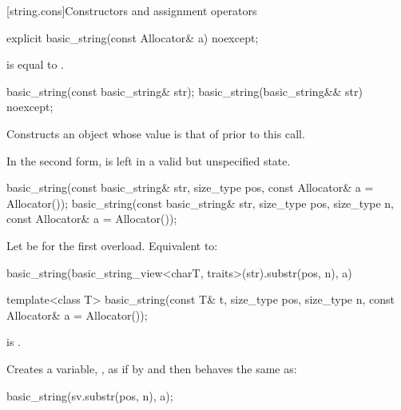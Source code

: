 [string.cons]{Constructors and assignment operators}

%
\begin{itemdecl}
explicit basic_string(const Allocator& a) noexcept;
\end{itemdecl}

\begin{itemdescr}

\pnum
\ensures
{} is equal to .
\end{itemdescr}

%
\begin{itemdecl}
basic_string(const basic_string& str);
basic_string(basic_string&& str) noexcept;
\end{itemdecl}

\begin{itemdescr}
\pnum
\effects
Constructs an object whose
value is that of  prior to this call.

\pnum
\remarks
In the second form,  is left in a valid but unspecified state.
\end{itemdescr}

%
\begin{itemdecl}
basic_string(const basic_string& str, size_type pos,
             const Allocator& a = Allocator());
basic_string(const basic_string& str, size_type pos, size_type n,
             const Allocator& a = Allocator());
\end{itemdecl}

\begin{itemdescr}
\pnum
\effects
Let  be  for the first overload. Equivalent to:
\begin{codeblock}
basic_string(basic_string_view<charT, traits>(str).substr(pos, n), a)
\end{codeblock}
\end{itemdescr}

%
\begin{itemdecl}
template<class T>
  basic_string(const T& t, size_type pos, size_type n, const Allocator& a = Allocator());
\end{itemdecl}

\begin{itemdescr}
\pnum
\constraints
{}
is .

\pnum
\effects Creates a variable, ,
as if by 
and then behaves the same as:
\begin{codeblock}
basic_string(sv.substr(pos, n), a);
\end{codeblock}
\end{itemdescr}

